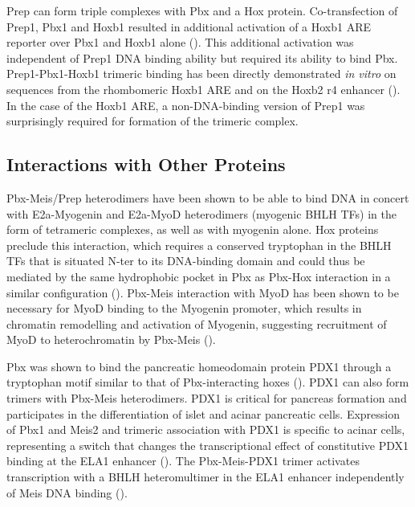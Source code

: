 Prep can form triple complexes with Pbx and a Hox protein. Co-transfection of Prep1, Pbx1 and Hoxb1 resulted in additional activation of a Hoxb1 \ac{ARE} reporter over Pbx1 and Hoxb1 alone (\cite{Berthelsen1998}). This additional activation was independent of Prep1 DNA binding ability but required its ability to bind Pbx. Prep1-Pbx1-Hoxb1 trimeric binding has been directly demonstrated \textit{in vitro} on sequences from the rhombomeric Hoxb1 \ac{ARE} and on the Hoxb2 r4 enhancer (\cite{Ferretti2000}). In the case of the Hoxb1 \ac{ARE}, a non-DNA-binding version of Prep1 was surprisingly required for formation of the trimeric complex. %

\subsection{Interactions with Other Proteins}

Pbx-Meis/Prep heterodimers have been shown to be able to bind DNA in concert with E2a-Myogenin and E2a-MyoD heterodimers (myogenic \ac{BHLH} \acp{TF}) in the form of tetrameric complexes, as well as with myogenin alone. Hox proteins preclude this interaction, which requires a conserved tryptophan in the \ac{BHLH} \acp{TF} that is situated \ac{N-ter} to its DNA-binding domain and could thus be mediated by the same hydrophobic pocket in Pbx as Pbx-Hox interaction in a similar configuration (\cite{Knoepfler1999}). Pbx-Meis interaction with MyoD has been shown to be necessary for MyoD binding to the Myogenin promoter, which results in chromatin remodelling and activation of Myogenin, suggesting recruitment of MyoD to heterochromatin by Pbx-Meis (\cite{Berkes2004}).


Pbx was shown to bind the pancreatic homeodomain protein PDX1 through a tryptophan motif similar to that of Pbx-interacting hoxes (\cite{Peers1995}). PDX1 can also form trimers with Pbx-Meis heterodimers. PDX1 is critical for pancreas formation and participates in the differentiation of islet and acinar pancreatic cells. Expression of Pbx1 and Meis2 and trimeric association with PDX1 is specific to acinar cells, representing a switch that changes the transcriptional effect of constitutive PDX1 binding at the ELA1 enhancer (\cite{Swift1998}). The Pbx-Meis-PDX1 trimer activates transcription with a \ac{BHLH} heteromultimer in the ELA1 enhancer independently of Meis DNA binding (\cite{Liu2001}).

